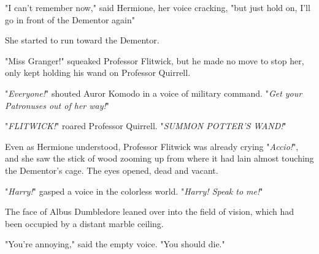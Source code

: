 "I can't remember now," said Hermione, her voice cracking, "but just hold on,
I'll go in front of the Dementor again{\el}"

She started to run toward the Dementor.

"Miss Granger!" squeaked Professor Flitwick, but he made no move to stop her,
only kept holding his wand on Professor Quirrell.

"\emph{Everyone!}" shouted Auror Komodo in a voice of military command.
"\emph{Get your Patronuses out of her way!}"

"\emph{FLITWICK!}" roared Professor Quirrell. "\emph{SUMMON POTTER'S WAND!}"

Even as Hermione understood, Professor Flitwick was already crying
"\emph{Accio!}", and she saw the stick of wood zooming up from where it had
lain almost touching the Dementor's cage.
\sbreak
The eyes opened, dead and vacant.

"\emph{Harry!}" gasped a voice in the colorless world. "\emph{Harry! Speak to
me!}"

The face of Albus Dumbledore leaned over into the field of vision, which had
been occupied by a distant marble ceiling.

"You're annoying," said the empty voice. "You should die."
